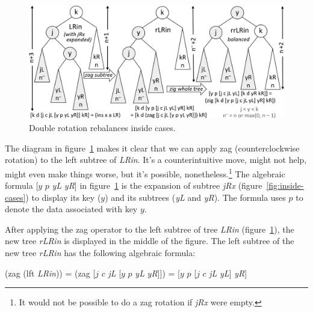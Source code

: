 \begin{figure}
\begin{center}
\includegraphics[scale=1]{images-cmyk/dbl-rotation}
\end{center}
\caption{Double rotation rebalances inside cases.}
\label{fig:dbl-rotation}
\end{figure}

The diagram in figure~\ref{fig:dbl-rotation}
makes it clear that we can apply \textsf{zag}
(counterclockwise rotation)
to the left subtree of \emph{LRin}.
It's a counterintuitive move, might not help, might even make things worse,
but it's possible, nonetheless.\footnote{\label{no-zag}It would not be possible
to do a \textsf{zag} rotation if \emph{jRx} were empty.}
The algebraic formula \textsf{[$y$ $p$} \emph{yL} \emph{yR}\textsf{]} in figure~\ref{fig:dbl-rotation}
is the expansion of subtree \emph{jRx} (figure~\ref{fig:inside-cases}) to display
its key ($y$) and its subtrees (\emph{yL} and \emph{yR}).
The formula uses $p$ to denote the data associated with key $y$.

After applying the \textsf{zag} operator to the left subtree of tree \emph{LRin}
(figure~\ref{fig:dbl-rotation}), the new tree \emph{rLRin} is displayed in
the middle of the figure. The left subtree of the new tree \emph{rLRin} has the following algebraic formula:
\begin{center}
\textsf{(zag (lft} \emph{LRin}\textsf{))} =
\textsf{(zag [$j$ $c$} \emph{jL} \textsf{[$y$ $p$} \emph{yL} \emph{yR}\textsf{]])} =
\textsf{[$y$ $p$ [$j$ $c$} \emph{jL} \emph{yL}\textsf{]} \emph{yR}\textsf{]}
\end{center}

